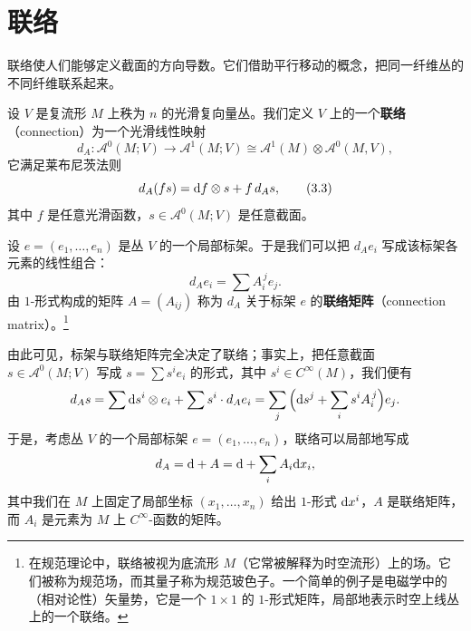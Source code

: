 \section{联络}

联络使人们能够定义截面的方向导数。它们借助平行移动的概念，把同一纤维丛的不同纤维联系起来。

\begin{definition}[3.17]
设 $V$ 是复流形 $M$ 上秩为 $n$ 的光滑复向量丛。我们定义 $V$ 上的一个\textbf{联络}（connection）为一个光滑线性映射
\[
d_A\colon \mathcal{A}^0(M;V)\to\mathcal{A}^1(M;V)\cong\mathcal{A}^1(M)\otimes\mathcal{A}^0(M,V) ,
\]
它满足莱布尼茨法则
\begin{equation}
d_A(fs)=\mathrm{d} f\otimes s+f\,d_A s , \tag{3.3}
\end{equation}
其中 $f$ 是任意光滑函数，$s\in\mathcal{A}^0(M;V)$ 是任意截面。
\end{definition}

设 $e=(e_1,\dots,e_n)$ 是丛 $V$ 的一个局部标架。于是我们可以把 $d_Ae_i$ 写成该标架各元素的线性组合：
\[
d_Ae_i=\sum A_i^{\,j}e_j .
\]
由 $1$-形式构成的矩阵 $A=(A_{ij})$ 称为 $d_A$ 关于标架 $e$ 的\textbf{联络矩阵}（connection matrix）。\footnote{在规范理论中，联络被视为底流形 $M$（它常被解释为时空流形）上的场。它们被称为规范场，而其量子称为规范玻色子。一个简单的例子是电磁学中的（相对论性）矢量势，它是一个 $1\times 1$ 的 $1$-形式矩阵，局部地表示时空上线丛上的一个联络。}

由此可见，标架与联络矩阵完全决定了联络；事实上，把任意截面 $s\in\mathcal{A}^0(M;V)$ 写成 $s=\sum s^ie_i$ 的形式，其中 $s^i\in C^\infty(M)$，我们便有
\[
d_As=\sum \mathrm{d} s^i\otimes e_i+\sum s^i\cdot d_Ae_i=\sum_j\Big(\mathrm{d} s^j+\sum_i s^iA_i^{\,j}\Big)e_j .
\]
于是，考虑丛 $V$ 的一个局部标架 $e=(e_1,\dots,e_n)$，联络可以局部地写成
\[
d_A=\mathrm{d}+A=\mathrm{d}+\sum_i A_i\mathrm{d} x_i ,
\]
其中我们在 $M$ 上固定了局部坐标 $(x_1,\dots,x_n)$ 给出 $1$-形式 $\mathrm{d} x^i$，$A$ 是联络矩阵，而 $A_i$ 是元素为 $M$ 上 $C^\infty$-函数的矩阵。

